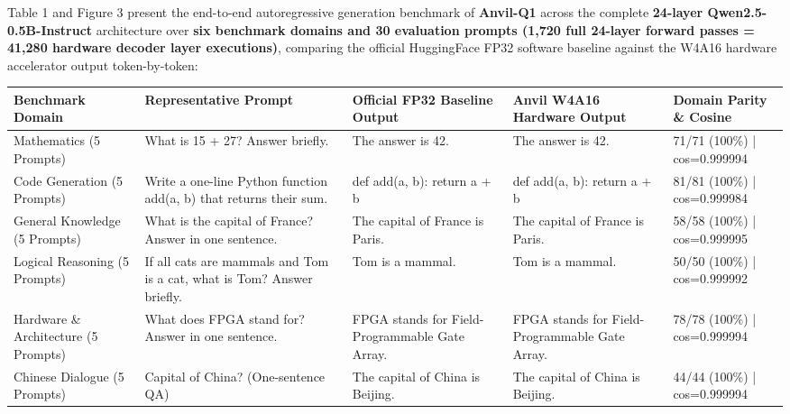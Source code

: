 \documentclass[11pt,a4paper]{article}
\begin{document}
Table 1 and Figure 3 present the end-to-end autoregressive generation benchmark of \textbf{Anvil-Q1} across the complete \textbf{24-layer Qwen2.5-0.5B-Instruct} architecture over \textbf{six benchmark domains and 30 evaluation prompts (1,720 full 24-layer forward passes = 41,280 hardware decoder layer executions)}, comparing the official HuggingFace FP32 software baseline against the W4A16 hardware accelerator output token-by-token:

{\footnotesize\renewcommand{\arraystretch}{1.14}\begin{longtable}{@{}L{0.16\textwidth}L{0.2\textwidth}L{0.19\textwidth}L{0.19\textwidth}L{0.16\textwidth}@{}}\toprule

\textbf{Benchmark Domain} & \textbf{Representative Prompt} & \textbf{Official FP32 Baseline Output} & \textbf{Anvil W4A16 Hardware Output} & \textbf{Domain Parity \& Cosine}\\\midrule\endhead

Mathematics (\allowbreak{}5 Prompts)\allowbreak{} & What is 15 +\allowbreak{} 27? Answer briefly. & The answer is 42. & The answer is 42. & 71/\allowbreak{}71 (\allowbreak{}100\%)\allowbreak{} | cos=\allowbreak{}0.999994\\[2pt]

Code Generation (\allowbreak{}5 Prompts)\allowbreak{} & Write a one-line Python function add(\allowbreak{}a,\allowbreak{} b)\allowbreak{} that returns their sum. & def add(\allowbreak{}a,\allowbreak{} b)\allowbreak{}:     return a +\allowbreak{} b & def add(\allowbreak{}a,\allowbreak{} b)\allowbreak{}:     return a +\allowbreak{} b & 81/\allowbreak{}81 (\allowbreak{}100\%)\allowbreak{} | cos=\allowbreak{}0.999984\\[2pt]

General Knowledge (\allowbreak{}5 Prompts)\allowbreak{} & What is the capital of France? Answer in one sentence. & The capital of France is Paris. & The capital of France is Paris. & 58/\allowbreak{}58 (\allowbreak{}100\%)\allowbreak{} | cos=\allowbreak{}0.999995\\[2pt]

Logical Reasoning (\allowbreak{}5 Prompts)\allowbreak{} & If all cats are mammals and Tom is a cat,\allowbreak{} what is Tom? Answer briefly. & Tom is a mammal. & Tom is a mammal. & 50/\allowbreak{}50 (\allowbreak{}100\%)\allowbreak{} | cos=\allowbreak{}0.999992\\[2pt]

Hardware \& Architecture (\allowbreak{}5 Prompts)\allowbreak{} & What does FPGA stand for? Answer in one sentence. & FPGA stands for Field-Programmable Gate Array. & FPGA stands for Field-Programmable Gate Array. & 78/\allowbreak{}78 (\allowbreak{}100\%)\allowbreak{} | cos=\allowbreak{}0.999994\\[2pt]

Chinese Dialogue (\allowbreak{}5 Prompts)\allowbreak{} & Capital of China? (\allowbreak{}One-sentence QA)\allowbreak{} & The capital of China is Beijing. & The capital of China is Beijing. & 44/\allowbreak{}44 (\allowbreak{}100\%)\allowbreak{} | cos=\allowbreak{}0.999994\\[2pt]

\bottomrule\end{longtable}}
\end{document}
